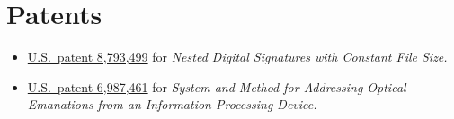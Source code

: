 \section*{Patents}

\begin{itemize}
    \item \href{http://google.com/patents/US8793499}{U.S.\ patent
        8,793,499} for \emph{Nested Digital Signatures with Constant
        File Size.}

    \item \href{http://www.google.com/patents/US6987461}{U.S.\ patent
        6,987,461} for \emph{System and Method for Addressing Optical
        Emanations from an Information Processing Device.}
\end{itemize}

